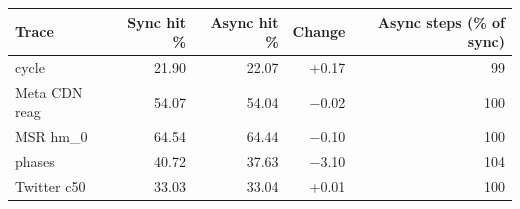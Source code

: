 \begin{tabular}{lrrrr}
\toprule
Trace & Sync hit \% & Async hit \% & Change & Async steps (\% of sync) \\
\midrule
cycle & 21.90 & 22.07 & +0.17 & 99 \\
Meta CDN reag & 54.07 & 54.04 & $-$0.02 & 100 \\
MSR hm\_0 & 64.54 & 64.44 & $-$0.10 & 100 \\
phases & 40.72 & 37.63 & $-$3.10 & 104 \\
Twitter c50 & 33.03 & 33.04 & +0.01 & 100 \\
\bottomrule
\end{tabular}
